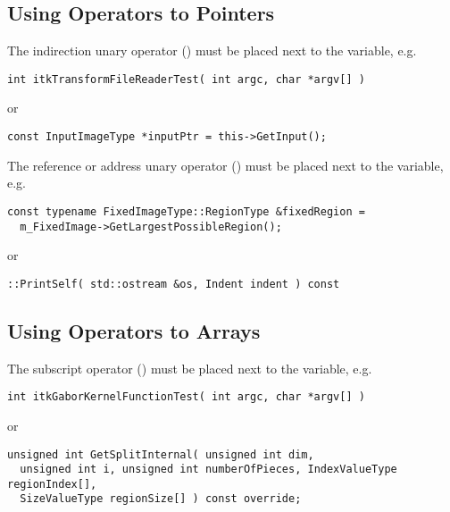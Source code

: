 \subsection{Using Operators to Pointers}
\label{subsec:UsingOperatorsToPointers}

The indirection unary operator (\code{*}) must be placed next to the variable, e.g.

\small
\begin{verbatim}
int itkTransformFileReaderTest( int argc, char *argv[] )
\end{verbatim}
\normalsize

or

\small
\begin{verbatim}
const InputImageType *inputPtr = this->GetInput();
\end{verbatim}
\normalsize

The reference or address unary operator (\code{\&}) must be placed next to the
variable, e.g.

\small
\begin{verbatim}
const typename FixedImageType::RegionType &fixedRegion =
  m_FixedImage->GetLargestPossibleRegion();
\end{verbatim}
\normalsize

or

\small
\begin{verbatim}
::PrintSelf( std::ostream &os, Indent indent ) const
\end{verbatim}
\normalsize


\subsection{Using Operators to Arrays}
\label{subsec:UsingOperatorsToArrays}

The subscript operator (\code{[]}) must be placed next to the variable, e.g.
\small
\begin{verbatim}
int itkGaborKernelFunctionTest( int argc, char *argv[] )
\end{verbatim}
\normalsize

or

\small
\begin{verbatim}
unsigned int GetSplitInternal( unsigned int dim,
  unsigned int i, unsigned int numberOfPieces, IndexValueType regionIndex[],
  SizeValueType regionSize[] ) const override;
\end{verbatim}
\normalsize



